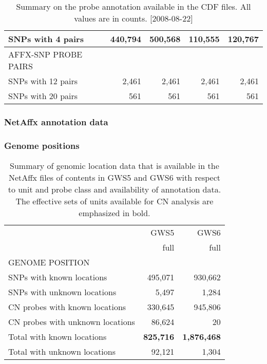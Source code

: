 \documentclass[11pt,a4paper]{article}
\newcommand{\GWSFive}{GWS5\xspace}
\newcommand{\GWSSix}{GWS6\xspace}
\begin{document}
\begin{table}
\begin{center}
\begin{tabular}{lrrrr}
SNPs with 4 pairs       &  440,794  &  500,568  &    110,555 &   120,767 \\
\hline
AFFX-SNP PROBE PAIRS     &	         &	  			 &	 				  &	 		      \\
SNPs with 12 pairs       &    2,461  &    2,461  &     2,461  &     2,461 \\
SNPs with 20 pairs       &      561  &      561  &       561  &       561 \\
\hline
\end{tabular}
\end{center}
\caption{Summary on the probe annotation available in the CDF files.  All values are in counts. [2008-08-22]}
\label{tblCdfProbes}
\end{table}



\subsubsection*{NetAffx annotation data}


\subsubsection*{Genome positions}

\begin{table}
\begin{center}
\begin{tabular}{lrr}
                        &  \GWSFive &   \GWSSix \\
                        &  full     &   full    \\
\hline
GENOME POSITION  			         	 &	  				&	 				  \\
SNPs with known locations        &  495,071  &   930,662 \\
SNPs with unknown locations      &    5,497  &     1,284 \\
CN probes with known locations   &  330,645  &   945,806 \\
CN probes with unknown locations &   86,624  &        20 \\
Total with known locations       & \textbf{825,716}  & \textbf{1,876,468} \\
Total with unknown locations     &   92,121  &     1,304 \\
\hline
\end{tabular}
\end{center}
\caption{Summary of genomic location data that is available in the NetAffx files of contents in \GWSFive and \GWSSix with respect to unit and probe class and availability of annotation data.  The effective sets of units available for CN analysis are emphasized in bold.}
\label{tblGenomicLocation}
\end{table}
\end{document}
